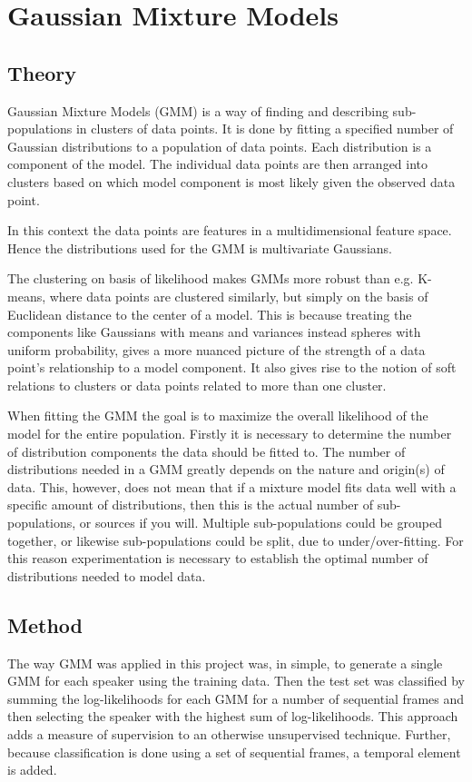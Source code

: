 \chapter{Gaussian Mixture Models}
\label{sec:GMM}
\section{Theory}

Gaussian Mixture Models (GMM) is a way of finding and describing sub-populations in clusters of data points. 
It is done by fitting a specified number of Gaussian distributions to a population of data points.
Each distribution is a component of the model. 
The individual data points are then arranged into clusters based on which model component is most likely given the observed data point.

In this context the data points are features in a multidimensional feature space. Hence the distributions used for the GMM is multivariate Gaussians.

The clustering on basis of likelihood makes GMMs more robust than e.g. K-means, where data points are clustered similarly, but simply on the basis of Euclidean distance to the center of a model. 
This is because treating the components like Gaussians with means and variances instead spheres with uniform probability, gives a more nuanced picture of the strength of a data point’s relationship to a model component. 
It also gives rise to the notion of soft relations to clusters or data points related to more than one cluster.

When fitting the GMM the goal is to maximize the overall likelihood of the model for the entire population.
Firstly it is necessary to determine the number of distribution components the data should be fitted to. 
The number of distributions needed in a GMM greatly depends on the nature and origin(s)
of data.
This, however, does not mean that if a mixture model fits data well with a specific amount of distributions, then this is the actual number of sub-populations, or sources if you will.
Multiple sub-populations could be grouped together, or likewise sub-populations could be split, due to under/over-fitting.
For this reason experimentation is necessary to establish the optimal number of distributions needed to model data.



\section{Method}
The way GMM was applied in this project was, in simple, to generate a single GMM for each speaker using the training data.
Then the test set was classified by summing the log-likelihoods for each GMM for a number of sequential frames and then selecting the speaker with the highest sum of log-likelihoods.
This approach adds a measure of supervision to an otherwise unsupervised technique.
Further, because classification is done using a set of sequential frames, a temporal element is added.

